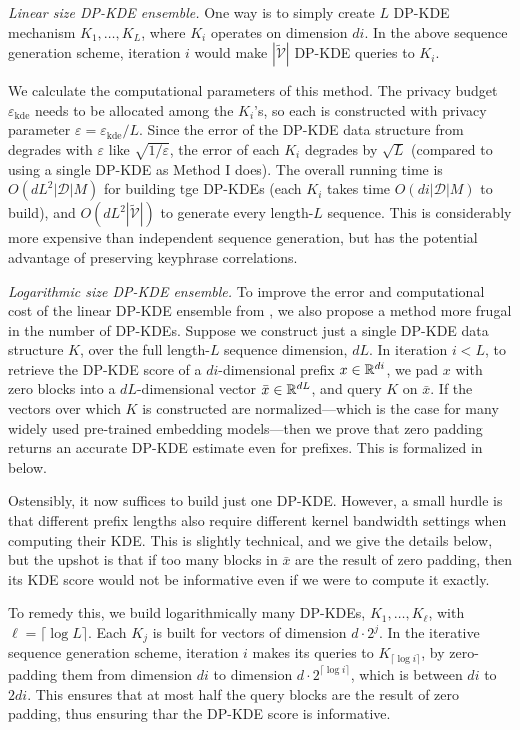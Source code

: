\noindent\emph{Linear size DP-KDE ensemble.}
One way is to simply create $L$ DP-KDE mechanism $K_1,\ldots,K_L$, where $K_i$ operates on dimension $di$. 
In the above sequence generation scheme, iteration $i$ would make $|\widetilde{\mathcal{V}}|$ DP-KDE queries to $K_i$. 

We calculate the computational parameters of this method. The privacy budget $\varepsilon_{\mathrm{kde}}$ needs to be allocated among the $K_i$'s, so each is constructed with privacy parameter $\varepsilon=\varepsilon_{\mathrm{kde}}/L$. Since the error of the DP-KDE data structure from \cite{wagner2023fast} degrades with $\varepsilon$ like $\sqrt{1/\varepsilon}$, the error of each $K_i$ degrades by $\sqrt{L}$ (compared to using a single DP-KDE as Method I does). 
The overall running time is $O(dL^2|\mathcal D|M)$ for building tge DP-KDEs (each $K_i$ takes time $O(di|\mathcal D|M)$ to build), and $O(dL^2|\widetilde{\mathcal{V}}|)$ to generate every length-$L$ sequence. This is considerably more expensive than independent sequence generation, but has the potential advantage of preserving keyphrase correlations.

\noindent\emph{Logarithmic size DP-KDE ensemble.}
To improve the error and computational cost of the linear DP-KDE ensemble from , we also propose a method more frugal in the number of DP-KDEs. 
Suppose we construct just a single DP-KDE data structure $K$, over the full length-$L$ sequence dimension, $dL$. In iteration $i<L$, to retrieve the DP-KDE score of a $di$-dimensional prefix $x\in\mathbb R^{di}$, we pad $x$ with zero blocks into a $dL$-dimensional vector $\bar x\in\mathbb R^{dL}$, and query $K$ on $\bar x$. If the vectors over which $K$ is constructed are normalized---which is the case for many widely used pre-trained embedding models---then we prove that zero padding returns an accurate DP-KDE estimate even for prefixes. This is formalized in  below.

Ostensibly, it now suffices to build just one DP-KDE. However, a small hurdle is that different prefix lengths also require different kernel bandwidth settings when computing their KDE. This is slightly technical, and we give the details below, but the upshot is that if too many blocks in $\bar x$ are the result of zero padding, then its KDE score would not be informative even if we were to compute it exactly.

To remedy this, we build logarithmically many DP-KDEs, $K_1,\ldots,K_\ell$, with $\ell=\lceil \log L \rceil$. 
Each $K_j$ is built for vectors of dimension $d\cdot2^j$. 
In the iterative sequence generation scheme, iteration $i$ makes its queries to $K_{\lceil \log i\rceil}$, by zero-padding them from dimension $di$ to dimension $d\cdot2^{\lceil \log i\rceil}$, which is between $di$ to $2di$. This ensures that at most half the query blocks are the result of zero padding, thus ensuring thar the DP-KDE score is informative.

